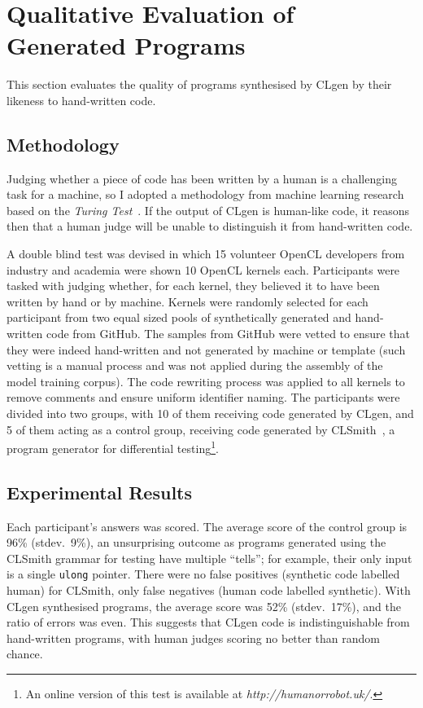 \section{Qualitative Evaluation of Generated Programs}
\label{sec:clgen-qualitative-evaluation}

This section evaluates the quality of programs synthesised by CLgen by their likeness to hand-written code.

\subsection{Methodology}

Judging whether a piece of code has been written by a human is a challenging task for a machine, so I adopted a methodology from machine learning research based on the \emph{Turing Test}~\cite{Gao2015a,Zhang2016,Vinyals}. If the output of CLgen is human-like code, it reasons then that a human judge will be unable to distinguish it from hand-written code.

A double blind test was devised in which 15 volunteer OpenCL developers from industry and academia were shown 10 OpenCL kernels each. Participants were tasked with judging whether, for each kernel, they believed it to have been written by hand or by machine. Kernels were randomly selected for each participant from two equal sized pools of synthetically generated and hand-written code from GitHub. The samples from GitHub were vetted to ensure that they were indeed hand-written and not generated by machine or template (such vetting is a manual process and was not applied during the assembly of the model training corpus). The code rewriting process was applied to all kernels to remove comments and ensure uniform identifier naming. The participants were divided into two groups, with 10 of them receiving code generated by CLgen, and 5 of them acting as a control group, receiving code generated by CLSmith~\cite{Lidbury2015a}, a program generator for differential testing\footnote{An online version of this test is available at \emph{http://humanorrobot.uk/}.}.

\subsection{Experimental Results}

Each participant's answers was scored. The average score of the control group is 96\% (stdev.\ 9\%), an unsurprising outcome as programs generated using the CLSmith grammar for testing have multiple ``tells''; for example, their only input is a single \texttt{ulong} pointer. There were no false positives (synthetic code labelled human) for CLSmith, only false negatives (human code labelled synthetic). With CLgen synthesised programs, the average score was 52\% (stdev.\ 17\%), and the ratio of errors was even. This suggests that CLgen code is indistinguishable from hand-written programs, with human judges scoring no better than random chance.